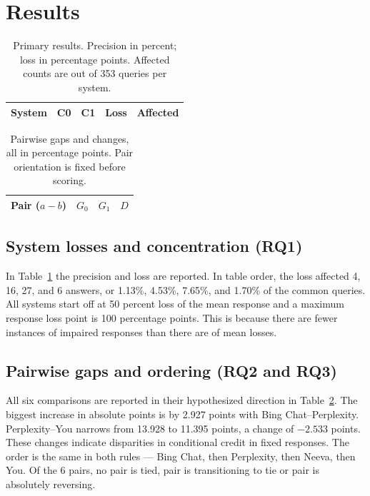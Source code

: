 \documentclass[acmsmall,screen,nonacm]{acmart}
\begin{document}
\section{Results}
\begin{table}[!htbp]
\centering\small
\caption{Primary results. Precision in percent; loss in percentage points. Affected counts are out of 353 queries per system.}
\begin{tabular}{lrrrr}\toprule
System & C0 & C1 & Loss & Affected\\\midrule

\end{tabular}\label{tab:system}
\end{table}
\begin{table}[!htbp]\centering\scriptsize
\caption{Pairwise gaps and changes, all in percentage points. Pair orientation is fixed before scoring.}
\begin{tabular}{lrrr}\toprule
Pair ($a-b$) & $G_0$ & $G_1$ & $D$\\\midrule

\end{tabular}\label{tab:gaps}
\end{table}
\subsection{System losses and concentration (RQ1)}
In Table~\ref{tab:system} the precision and loss are reported. In table order, the loss affected 4, 16, 27, and 6 answers, or 1.13\%, 4.53\%, 7.65\%, and 1.70\% of the common queries. All systems start off at 50 percent loss of the mean response and a maximum response loss point is 100 percentage points. This is because there are fewer instances of impaired responses than there are of mean losses.

\subsection{Pairwise gaps and ordering (RQ2 and RQ3)}
All six comparisons are reported in their hypothesized direction in Table~\ref{tab:gaps}. The biggest increase in absolute points is by 2.927 points with Bing Chat--Perplexity. Perplexity--You narrows from 13.928 to 11.395 points, a change of $-2.533$ points. These changes indicate disparities in conditional credit in fixed responses. The order is the same in both rules — Bing Chat, then Perplexity, then Neeva, then You. Of the 6 pairs, no pair is tied, pair is transitioning to tie or pair is absolutely reversing.
\end{document}
